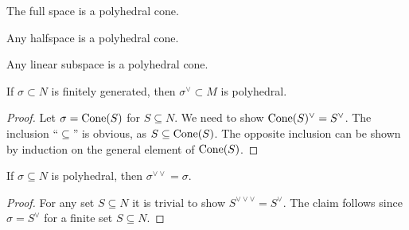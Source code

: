 \begin{proposition}
  \label{all-polyhedral-cone}
  \leanok
  The full space is a polyhedral cone.
\end{proposition}

\begin{proposition}
  \label{halfspace-polyhedral-cone}
  Any halfspace is a polyhedral cone.
\end{proposition}

\begin{proposition}
  \label{linear-subspace-polyhedral-cone}
  Any linear subspace is a polyhedral cone.
\end{proposition}


\begin{proposition}
  \label{dual-polyhedral}
  \leanok
  If \( \sigma \subset N \) is finitely generated, then \( \sigma^\vee
  \subset M \) is polyhedral.
\end{proposition}
\begin{proof}
  \uses{}
  \leanok
  Let \( \sigma = \operatorname{Cone}(S) \) for \( S \subseteq N \). We need to show
  \( \operatorname{Cone}(S)^\vee = S^\vee \). The inclusion ``\( \subseteq \)'' is
  obvious, as \( S \subseteq \operatorname{Cone}(S) \). The opposite inclusion can
  be shown by induction on the general element of \( \operatorname{Cone}(S) \).
\end{proof}

\begin{proposition}
  \label{double-dual-polyhedral-cone}
  \leanok
  If \( \sigma \subseteq N \) is polyhedral, then \( \sigma^{\vee\vee}
  = \sigma \).
\end{proposition}
\begin{proof}
  \uses{}
  \leanok
  For any set \( S \subseteq N \) it is trivial to show \(
  S^{\vee\vee\vee} = S^{\vee} \). The claim follows since \( \sigma =
  S^{\vee} \) for a finite set \( S \subseteq N \).
\end{proof}


